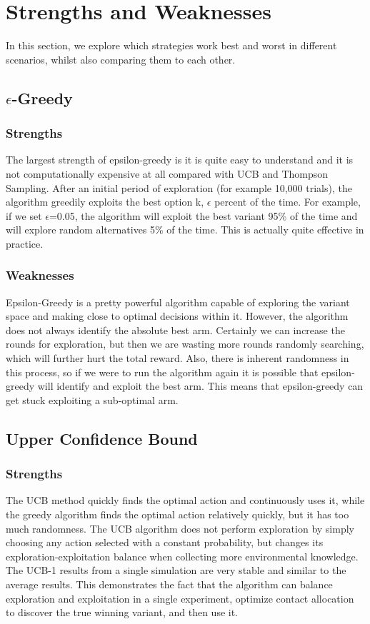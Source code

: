 \section{Strengths and Weaknesses}
In this section, we explore which strategies work best and worst in different scenarios, whilst also comparing them to each other.

\subsection{$\epsilon$-Greedy}

\subsubsection{Strengths}
The largest strength of epsilon-greedy is it is quite easy to understand and it is not computationally expensive at all compared with UCB and Thompson Sampling. After an initial period of exploration (for example 10,000 trials), the algorithm greedily exploits the best option k, $\epsilon$ percent of the time. For example, if we set $\epsilon$=0.05, the algorithm will exploit the best variant 95\% of the time and will explore random alternatives 5\% of the time. This is actually quite effective in practice.

\subsubsection{Weaknesses}
Epsilon-Greedy is a pretty powerful algorithm capable of exploring the variant space and making close to optimal decisions within it. However, the algorithm does not always identify the absolute best arm. Certainly we can increase the rounds for exploration, but then we are wasting more rounds randomly searching, which will further hurt the total reward. Also, there is inherent randomness in this process, so if we were to run the algorithm again it is possible that epsilon-greedy will identify and exploit the best arm. This means that epsilon-greedy can get stuck exploiting a sub-optimal arm.

\subsection{Upper Confidence Bound}

\subsubsection{Strengths}
The UCB method quickly finds the optimal action and continuously uses it, while the greedy algorithm finds the optimal action relatively quickly, but it has too much randomness.
The UCB algorithm does not perform exploration by simply choosing any action selected with a constant probability, but changes its exploration-exploitation balance when collecting more environmental knowledge.
\\The UCB-1 results from a single simulation are very stable and similar to the average results. This demonstrates the fact that the algorithm can balance exploration and exploitation in a single experiment, optimize contact allocation to discover the true winning variant, and then use it.


